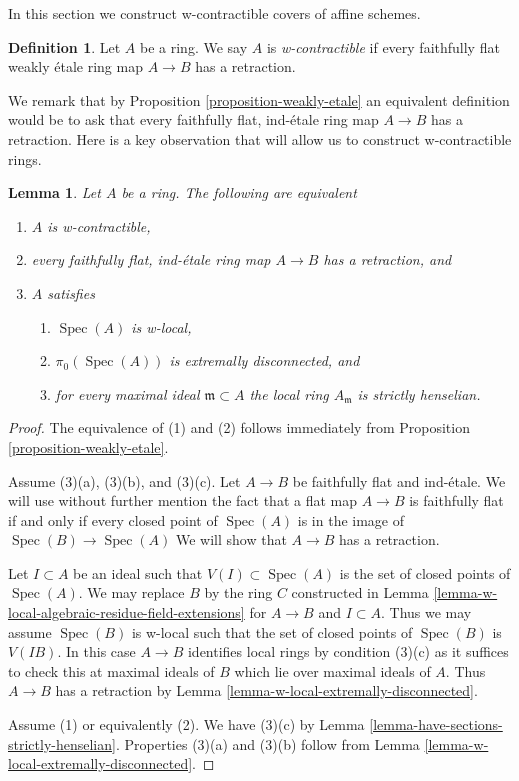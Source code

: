 \documentclass[10pt,a4paper]{article}
\theoremstyle{plain}
\newtheorem{lemma}[subsection]{Lemma}
\theoremstyle{definition}
\newtheorem{definition}[subsection]{Definition}
\theoremstyle{remark}
\numberwithin{equation}{subsection}
\def\Spec{\mathop{\mathrm{Spec}}}
\begin{document}
\noindent
In this section we construct w-contractible covers of affine schemes.

\begin{definition}
\label{definition-w-contractible}
Let $A$ be a ring. We say $A$ is {\it w-contractible} if every
faithfully flat weakly \'etale ring map $A \to B$ has a retraction.
\end{definition}

\noindent
We remark that by Proposition \ref{proposition-weakly-etale}
an equivalent definition would be to ask that every faithfully
flat, ind-\'etale ring map $A \to B$ has a retraction.
Here is a key observation that will allow us to construct
w-contractible rings.

\begin{lemma}
\label{lemma-w-local-strictly-henselian-extremally-disconnected}
Let $A$ be a ring. The following are equivalent
\begin{enumerate}
\item $A$ is w-contractible,
\item every faithfully flat, ind-\'etale ring map $A \to B$ has
a retraction, and
\item $A$ satisfies
\begin{enumerate}
\item $\Spec(A)$ is w-local,
\item $\pi_0(\Spec(A))$ is extremally disconnected, and
\item for every maximal ideal $\mathfrak m \subset A$ the
local ring $A_\mathfrak m$ is strictly henselian.
\end{enumerate}
\end{enumerate}
\end{lemma}

\begin{proof}
The equivalence of (1) and (2) follows immediately from
Proposition \ref{proposition-weakly-etale}.

\medskip\noindent
Assume (3)(a), (3)(b), and (3)(c). Let $A \to B$ be faithfully flat
and ind-\'etale. We will use without further mention the fact that a flat map
$A \to B$ is faithfully flat if and only if every closed point
of $\Spec(A)$ is in the image of $\Spec(B) \to \Spec(A)$
We will show that $A \to B$ has a retraction.

\medskip\noindent
Let $I \subset A$ be an ideal such that $V(I) \subset \Spec(A)$ is
the set of closed points of $\Spec(A)$. 
We may replace $B$ by the ring $C$ constructed in
Lemma \ref{lemma-w-local-algebraic-residue-field-extensions}
for $A \to B$ and $I \subset A$.
Thus we may assume $\Spec(B)$ is w-local such that the set of
closed points of $\Spec(B)$ is $V(IB)$. In this case $A \to B$
identifies local rings by condition (3)(c) as it suffices to check
this at maximal ideals of $B$ which lie over maximal ideals of $A$.
Thus $A \to B$ has a retraction by
Lemma \ref{lemma-w-local-extremally-disconnected}.

\medskip\noindent
Assume (1) or equivalently (2). We have (3)(c) by
Lemma \ref{lemma-have-sections-strictly-henselian}.
Properties (3)(a) and (3)(b) follow from
Lemma \ref{lemma-w-local-extremally-disconnected}.
\end{proof}
\end{document}
